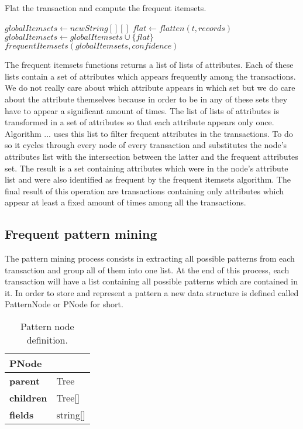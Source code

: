 \documentclass{acm_proc_article-sp-sigmod09}
\begin{document}
\begin{algorithm}
\caption{Flat the transaction and compute the frequent itemsets.}
\label{freqitemset}
\begin{algorithmic}[1]
\State $globalItemsets \gets new String[][]$
	\State $flat \gets flatten(t, records)$
	\State $globalItemsets \gets globalItemsets \cup \{flat\}$
\EndFor
\Return $frequentItemsets(globalItemsets, confidence)$
\EndFunction
\end{algorithmic}
\end{algorithm}

The frequent itemsets functions returns a list of lists of attributes. Each of these lists contain a set of attributes which appears frequently among the transactions. We do not really care about which attribute appears in which set but we do care about the attribute themselves because in order to be in any of these sets they have to appear a significant amount of times. The list of lists of attributes is transformed in a set of attributes so that each attribute appears only once. Algorithm ... uses this list to filter frequent attributes in the transactions. To do so it cycles through every node of every transaction and substitutes the node's attributes list with the intersection between the latter and the frequent attributes set. The result is a set containing attributes which were in the node's attribute list and were also identified as frequent by the frequent itemsets algorithm. The final result of this operation are transactions containing only attributes which appear at least a fixed amount of times among all the transactions.

\subsection{Frequent pattern mining}

The pattern mining process consists in extracting all possible patterns from each transaction and group all of them into one list. At the end of this process, each transaction will have a list containing all possible patterns which are contained in it. In order to store and represent a pattern a new data structure is defined called PatternNode or PNode for short.

\begin{table}[H]
\centering
\begin{tabular}{|ll|} \hline
\textbf{PNode} & \\ \hline
\textbf{parent} & Tree \\ \hline
\textbf{children} & Tree[] \\ \hline
\textbf{fields} & string[] \\
\hline\end{tabular}
\caption{Pattern node definition.}
\label{tab:tree}
\end{table}
\end{document}
